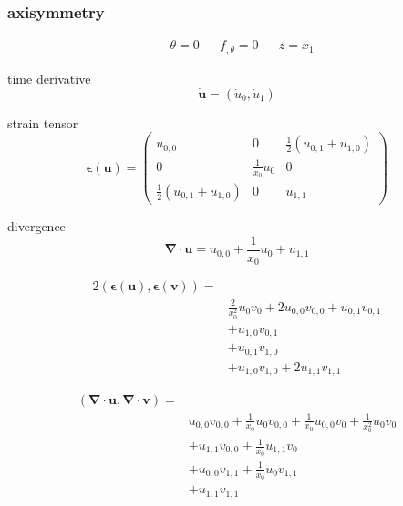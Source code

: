 \documentclass{scrartcl}
\newcommand{\vect}[1]{\boldsymbol{#1}}
\newcommand{\ten}[1]{\boldsymbol{#1}}
\begin{document}
\subsubsection{axisymmetry}

\begin{align*}
&\theta = 0 & &f_{,\theta} = 0 & & z = x_1
\end{align*}

time derivative
\[
\dot{\vect{u}} = ( \dot{u}_0, \dot{u}_1 )
\]

strain tensor
\[
\ten{\epsilon}(\vect{u}) = 
\begin{pmatrix}
u_{0,0} & 0 & \frac{1}{2}(u_{0,1} + u_{1,0}) \\
0 & \frac{1}{x_0}u_0 & 0 \\
\frac{1}{2}(u_{0,1} + u_{1,0}) & 0 & u_{1,1} 
\end{pmatrix}
\]

divergence
\[
\vect{\nabla} \cdot \vect{u} = u_{0,0} + \frac{1}{x_0}u_0 + u_{1,1}
\]

\begin{align*}
2(\ten{\epsilon}(\vect{u}), \ten{\epsilon}(\vect{v})) =& \\
&\frac{2}{x_0^2}u_0 v_0 + 2 u_{0,0} v_{0,0} + u_{0,1} v_{0,1} \\
&+ u_{1,0} v_{0,1} \\
&+ u_{0,1} v_{1,0} \\
&+ u_{1,0} v_{1,0} + 2 u_{1,1} v_{1,1}
\end{align*}

\begin{align*}
(\vect{\nabla} \cdot \vect{u}, \vect{\nabla} \cdot \vect{v}) =& \\
& u_{0,0} v_{0,0} + \frac{1}{x_0} u_0 v_{0,0} 
+ \frac{1}{x_0} u_{0,0} v_0 + \frac{1}{x_0^2} u_0 v_0 \\
&+ u_{1,1} v_{0,0} + \frac{1}{x_0} u_{1,1} v_0 \\
&+ u_{0,0} v_{1,1} + \frac{1}{x_0} u_0 v_{1,1} \\
&+ u_{1,1} v_{1,1}
\end{align*}
\end{document}
